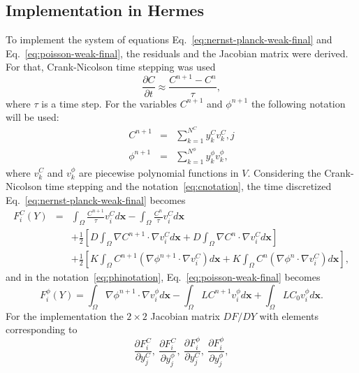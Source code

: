 \subsection{Implementation in Hermes}
To implement the system of equations Eq.~\eqref{eq:nernst-planck-weak-final}
and Eq.~\eqref{eq:poisson-weak-final}, the residuals and the Jacobian
matrix were derived. For that, Crank-Nicolson time stepping was
used
\begin{equation}
  \frac{\partial C}{\partial t} \approx \frac{C^{n+1} - C^n}{\tau},
  \label{eq:cranic}
\end{equation}
where $\tau$ is a time step. For the variables $C^{n+1}$ and $\phi^{n+1}$ the
following notation will be used:
\begin{eqnarray}
  C^{n+1} &=& \sum_{k=1}^{N^C} y_k^{C} v_k^{C}, \label{eq:cnotation}j\\
  \phi^{n+1} &=& \sum_{k=1}^{N^{\phi}} y_k^{\phi} v_k^{\phi}\label{eq:phinotation},
\end{eqnarray}
where $v_k^C$ and $v_k^\phi$ are piecewise polynomial functions in $V$.
Considering the Crank-Nicolson time stepping and the notation~\eqref{eq:cnotation},
the time discretized Eq.~\eqref{eq:nernst-planck-weak-final} becomes
\begin{eqnarray}
  F_i^C\left(Y\right) & = & \int_{\Omega} \frac{C^{n+1}}{\tau}v_i^C d\mathbf{x} - 
  \int_{\Omega} \frac{C^{n}}{\tau}v_i^C d\mathbf{x}\nonumber\\
  &&+\frac 12 \left[D\int_{\Omega} \nabla C^{n+1} \cdot \nabla v_i^C d\mathbf{x}+ 
  	D\int_{\Omega} \nabla C^{n} \cdot \nabla v_i^C d\mathbf{x}\right]\nonumber\\
  &&+ \frac 12 \left[K\int_{\Omega}C^{n+1} \left(\nabla \phi^{n+1} \cdot \nabla v_i^C\right) d\mathbf{x}+
  K\int_{\Omega}C^{n} \left(\nabla \phi^{n} \cdot \nabla v_i^C\right) d\mathbf{x}\right]\label{eq:Fc},
\end{eqnarray}
and in the notation~\eqref{eq:phinotation}, Eq.~\eqref{eq:poisson-weak-final} becomes
\begin{equation}
  F_i^{\phi}\left(Y\right) = \int_{\Omega} \nabla \phi^{n+1} \cdot \nabla v_i^{\phi} d\mathbf{x} 
  - \int_{\Omega} LC^{n+1}v_i^{\phi} d\mathbf{x} + \int_{\Omega} LC_0 v_i^{\phi} d\mathbf{x}.
  \label{eq:Fphi}
\end{equation}
For the implementation the $2\times 2$ Jacobian matrix $DF/DY$ with elements corresponding to
\begin{equation}
  \frac{\partial F_i^C}{\partial y_j^C}, \ \frac{\partial F_i^C}{\partial y_j^{\phi}},\  
  \frac{\partial F_i^{\phi}}{\partial y_j^C}, \ \frac{\partial F_i^{\phi}}{\partial y_j^{\phi}},
\end{equation}
